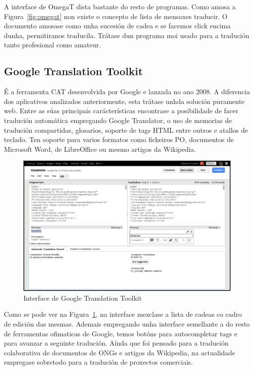 A interface de OmegaT dista bastante do resto de programas. Como amosa a Figura~\ref{fig:omegat} non existe o concepto de lista de mensaxes traducir. O documento amosase como unha sucesión de cadea e se facemos click encima dunha, permitiranos traducila. Trátase dun programa moi usado para a tradución tanto profesional como amateur.


\subsection{Google Translation Toolkit}
É a ferramenta CAT desenvolvida por Google e lanzada no ano 2008. A diferencia dos aplicativos analizados anteriormente, esta trátase unhda solución puramente web. Entre as súas principais carácterísticas encontrase a posibilidade de facer tradución automática empregando Google Translator, o uso de memorias de tradución compartidas, glosarios, soporte de tags HTML entre outros e atallos de teclado. Ten soporte para varios formatos como ficheiros PO, documentos de Microsoft Word, de LibreOffice ou mesmo artigos da Wikipedia.

\begin{figure}[h]
    \centering
    \includegraphics[width=\textwidth]{img/captura_googletranslationtoolkit.png}
    \caption{Interface de Google Translation Toolkit}
    \label{fig:translatetoolkit}
\end{figure}

Como se pode ver na Figura~\ref{fig:translatetoolkit}, na interface mezclase a lista de cadeas co cadro de edición das mesmas. Ademais empregando unha interface semellante a do resto de ferramentas ofimaticas de Google, temos botóns para autocompletar tags e para avanzar a seguinte tradución. Aínda que foi pensado para a tradución colaborativa de documentos de ONGs e artigos da Wikipedia, na actualidade empregase sobretodo para a tradución de proxectos comerciais.


